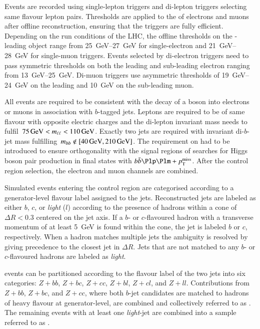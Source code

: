 Events are recorded using single-lepton triggers and di-lepton
triggers selecting same flavour lepton pairs. Thresholds are applied
to the \pT of electrons and muons after offline reconstruction,
ensuring that the triggers are fully efficient. Depending on the run
conditions of the LHC, the offline thresholds on the \pT-leading
object range from \SIrange{25}{27}{\GeV} for single-electron and
\SIrange{21}{28}{\GeV} for single-muon triggers. Events selected by
di-electron triggers need to pass symmetric \pT thresholds on both the
leading and sub-leading electron ranging from
\SIrange{13}{25}{\GeV}. Di-muon triggers use asymmetric thresholds of
\SIrange{19}{24}{\GeV} on the leading and \SI{10}{\GeV} on the
sub-leading muon.

All events are required to be consistent with the decay of a \PZ boson
into electrons or muons in association with $b$-tagged jets. Leptons
are required to be of same flavour with opposite electric charges and
the di-lepton invariant mass needs to
fulfil~$\SI{75}{\ensuremath{\text{GeV}}} < m_{\ell\ell} < \SI{110}{\ensuremath{\text{GeV}}}$. Exactly two \btagged
jets are required with invariant di-$b$-jet mass
fulfilling~$\mBB \not\in [\SI{40}{\GeV}, \SI{210}{\GeV}]$. The
requirement on \mBB had to be introduced to ensure orthogonality with
the signal regions of searches for Higgs boson pair production in
final states with $\bbbar\Plp\Plm + \pTmissAbs$. After the \ZHF
control region selection, the electron and muon channels are combined.

Simulated \Zjets events entering the \ZHF control region are
categorised according to a generator-level flavour label assigned to
the \btagged jets. Reconstructed jets are labeled as either $b$, $c$,
or \emph{light} ($l$) according to the presence of hadrons within a
cone of $\Delta R < 0.3$ centered on the jet axis. If a $b$- or
$c$-flavoured hadron with a transverse momentum of at least
\SI{5}{\GeV} is found within the cone, the jet is labeled $b$ or $c$,
respectively. When a hadron matches multiple jets the ambiguity is
resolved by giving precedence to the closest jet in $\Delta R$. Jets
that are not matched to any $b$- or $c$-flavoured hadrons are labeled
as \emph{light}.

\Zjets events can be partitioned according to the flavour label of the
two \btagged jets into six categories: $Z + bb$, $Z + bc$, $Z + cc$,
$Z + bl$, $Z + cl$, and $Z + ll$. Contributions from $Z + bb$,
$Z + bc$, and $Z + cc$, where both $b$-jet candidates are matched to
hadrons of heavy flavour at generator-level, are combined and
collectively referred to as \ZHF. The remaining \Zjets events with at
least one \emph{light}-jet are combined into a sample referred to as
\ZLF.

